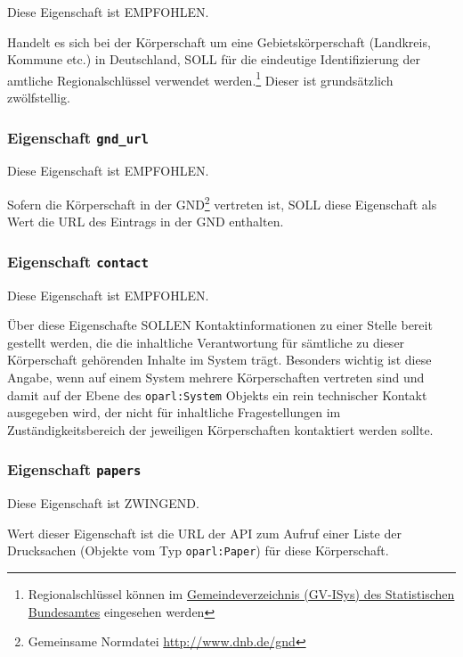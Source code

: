 \documentclass[,a4paper]{article}
\begin{document}
Diese Eigenschaft ist EMPFOHLEN.

Handelt es sich bei der Körperschaft um eine Gebietskörperschaft
(Landkreis, Kommune etc.) in Deutschland, SOLL für die eindeutige
Identifizierung der amtliche Regionalschlüssel verwendet
werden.\footnote{Regionalschlüssel können im
  \href{https://www.destatis.de/DE/ZahlenFakten/LaenderRegionen/Regionales/Gemeindeverzeichnis/Gemeindeverzeichnis.html}{Gemeindeverzeichnis
  (GV-ISys) des Statistischen Bundesamtes} eingesehen werden} Dieser ist
grundsätzlich zwölfstellig.

\subsubsection{Eigenschaft
\texttt{gnd\_url}}\label{eigenschaft-gndux5furl}

Diese Eigenschaft ist EMPFOHLEN.

Sofern die Körperschaft in der GND\footnote{Gemeinsame Normdatei
  \url{http://www.dnb.de/gnd}} vertreten ist, SOLL diese Eigenschaft als
Wert die URL des Eintrags in der GND enthalten.

\subsubsection{Eigenschaft \texttt{contact}}\label{eigenschaft-contact}

Diese Eigenschaft ist EMPFOHLEN.

Über diese Eigenschafte SOLLEN Kontaktinformationen zu einer Stelle
bereit gestellt werden, die die inhaltliche Verantwortung für sämtliche
zu dieser Körperschaft gehörenden Inhalte im System trägt. Besonders
wichtig ist diese Angabe, wenn auf einem System mehrere Körperschaften
vertreten sind und damit auf der Ebene des \texttt{oparl:System} Objekts
ein rein technischer Kontakt ausgegeben wird, der nicht für inhaltliche
Fragestellungen im Zuständigkeitsbereich der jeweiligen Körperschaften
kontaktiert werden sollte.

\subsubsection{Eigenschaft \texttt{papers}}\label{eigenschaft-papers}

Diese Eigenschaft ist ZWINGEND.

Wert dieser Eigenschaft ist die URL der API zum Aufruf einer Liste der
Drucksachen (Objekte vom Typ \texttt{oparl:Paper}) für diese
Körperschaft.
\end{document}
